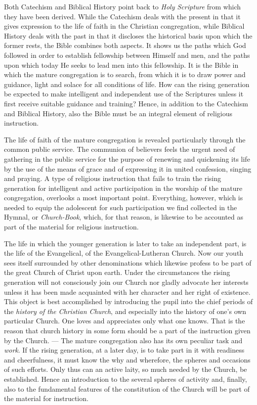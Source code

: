 Both Catechism and Biblical History point back to \emph{Holy Scripture} from which they have been derived. While the Catechism deals with the present in that it gives expression to the life of faith in the Christian congregation, while Biblical History deals with the past in that it discloses the historical basis upon which the former rests, the Bible combines both aspects. It shows us the paths which God followed in order to establish fellowship between Himself and men, and the paths upon which today He seeks to lead men into this fellowship. It is the Bible in which the mature congregation is to search, from which it is to draw power and guidance, light and solace for all conditions of life. How can the rising generation be expected to make intelligent and independent use of the Scriptures unless it first receive suitable guidance and training? Hence, in addition to the Catechism and Biblical History, also the Bible must be an integral element of religious instruction.

The life of faith of the mature congregation is revealed particularly through the common public service. The communion of believers feels the urgent need of gathering in the public service for the purpose of renewing and quickening its life by the use of the means of grace and of expressing it in united confession, singing and praying. A type of religious instruction that fails to train the rising generation for intelligent and active participation in the worship of the mature congregation, overlooks a most important point. Everything, however, which is needed to equip the adolescent for such participation we find collected in the Hymnal, or \emph{Church-Book}, which, for that reason, is likewise to be accounted as part of the material for religious instruction.

The life in which the younger generation is later to take an independent part, is the life of the Evangelical, of the
Evangelical-Lutheran Church. Now our youth sees itself surrounded by other denominations which likewise profess to be part of the great Church of Christ upon earth. Under the circumstances the rising generation will not consciously join our Church nor gladly advocate her interests unless it has been made acquainted with her character and her right of existence. This object is best accomplished by introducing the pupil into the chief periods of the \emph{history of the Christian Church}, and especially into the history of one’s own particular Church. One loves and appreciates only what one knows. That is the reason that church history in some form should be a part of the instruction given by the Church. — The mature congregation also has its own peculiar task and \emph{work}. If the rising generation, at a later day, is to take part in it with readiness and cheerfulness, it must know the why and wherefore, the spheres and occasions of such efforts. Only thus can an active laity, so much needed by the Church, be established. Hence an introduction to the several spheres of activity and, finally, also to the fundamental features of the constitution of the Church will be part of the material for instruction.

